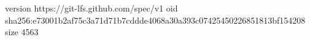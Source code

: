 version https://git-lfs.github.com/spec/v1
oid sha256:e73001b2af75c3a71d71b7cddde4068a30a393c07425450226851813bf154208
size 4563
